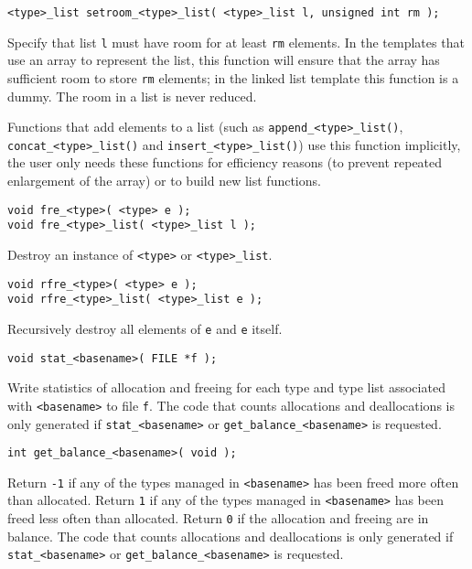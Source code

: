 \begin{verbatim}
<type>_list setroom_<type>_list( <type>_list l, unsigned int rm );
\end{verbatim}
\begin{desc}
Specify that list \texttt{l} must have room for at least \texttt{rm} elements.
In the templates that use an array to represent the list,
this function will ensure that the array has sufficient room to
store \texttt{rm} elements;
in the linked list template this function is a dummy.
The room in a list is never reduced.
\par
Functions that add elements to a list (such as \verb+append_<type>_list()+,
\verb+concat_<type>_list()+ and
\verb+insert_<type>_list()+) use this function implicitly, the
user only needs these functions for efficiency reasons
(to prevent repeated enlargement of the array)
or to build new list functions.
\end{desc}
\begin{verbatim}
void fre_<type>( <type> e );
void fre_<type>_list( <type>_list l );
\end{verbatim}
\begin{desc}
Destroy an instance of \texttt{<type>} or \texttt{<type>\_list}.
\end{desc}
\begin{verbatim}
void rfre_<type>( <type> e );
void rfre_<type>_list( <type>_list e );
\end{verbatim}
\begin{desc}
Recursively destroy all elements of \texttt{e} and \texttt{e} itself.
\end{desc}
\begin{verbatim}
void stat_<basename>( FILE *f );
\end{verbatim}
\begin{desc}
Write statistics of allocation and freeing for each type and type list
associated with \texttt{<basename>} to file \texttt{f}. The code that counts
allocations and deallocations is only generated if \verb'stat_<basename>'
or \verb'get_balance_<basename>' is requested.
\end{desc}
\begin{verbatim}
int get_balance_<basename>( void );
\end{verbatim}
\begin{desc}
\begin{sloppypar}
Return \verb+-1+ if any of the types managed in \verb"<basename>"
has been freed more often than allocated.  Return \verb+1+ if any of
the types managed in \verb"<basename>" has been freed less often than
allocated. Return \verb+0+ if the allocation and freeing are in balance.
The code that counts allocations and deallocations is only generated if
\verb'stat_<basename>' or \verb'get_balance_<basename>' is requested.
\end{sloppypar}
\end{desc}
